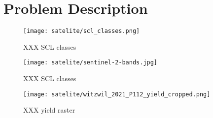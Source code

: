 \chapter{Problem Description}


\begin{figure}[h]
    \caption{XXX SCL classes}
    \label{tab:satelite/scl_classes}
    \center
    \texttt{[image: satelite/scl\_classes.png]}
\end{figure}

\begin{figure}[h]
    \label{fig:satelite/sentinel-2-bands}
    \center
    \texttt{[image: satelite/sentinel-2-bands.jpg]}
    \caption{XXX SCL classes}
\end{figure}

\begin{figure}[h]
    \label{fig:satelite/yield-raster}
    \center
    \texttt{[image: satelite/witzwil\_2021\_P112\_yield\_cropped.png]}
    \caption{XXX yield raster}
\end{figure}



